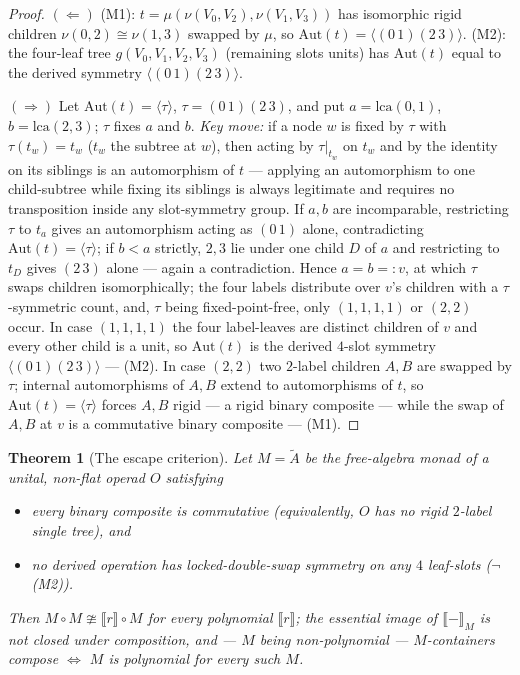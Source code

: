 \documentclass[11pt]{amsart}
\theoremstyle{plain}
\newtheorem{theorem}{Theorem}[section]
\theoremstyle{definition}
\newcommand{\ext}[1]{\llbracket #1 \rrbracket}
\newcommand{\extM}[1]{\llbracket #1 \rrbracket_{M}}
\begin{document}
\begin{proof}
$(\Leftarrow)$ (M1): $t=\mu(\nu(V_0,V_2),\nu(V_1,V_3))$ has isomorphic rigid children
$\nu(0,2)\cong\nu(1,3)$ swapped by $\mu$, so $\mathrm{Aut}(t)=\langle(0\,1)(2\,3)\rangle$. (M2): the
four-leaf tree $g(V_0,V_1,V_2,V_3)$ (remaining slots units) has $\mathrm{Aut}(t)$ equal to the derived
symmetry $\langle(0\,1)(2\,3)\rangle$.

$(\Rightarrow)$ Let $\mathrm{Aut}(t)=\langle\tau\rangle$, $\tau=(0\,1)(2\,3)$, and put
$a=\mathrm{lca}(0,1)$, $b=\mathrm{lca}(2,3)$; $\tau$ fixes $a$ and $b$. \emph{Key move:} if a node $w$ is
fixed by $\tau$ with $\tau(t_w)=t_w$ \textup{(}$t_w$ the subtree at $w$\textup{)}, then acting by
$\tau|_{t_w}$ on $t_w$ and by the identity on its siblings is an automorphism of $t$ --- applying an
automorphism to one child-subtree while fixing its siblings is always legitimate and requires no
transposition inside any slot-symmetry group. If $a,b$ are incomparable, restricting $\tau$ to $t_a$ gives
an automorphism acting as $(0\,1)$ alone, contradicting $\mathrm{Aut}(t)=\langle\tau\rangle$; if $b<a$
strictly, $2,3$ lie under one child $D$ of $a$ and restricting to $t_D$ gives $(2\,3)$ alone --- again a
contradiction. Hence $a=b=:v$, at which $\tau$ swaps children isomorphically; the four labels distribute
over $v$'s children with a $\tau$-symmetric count, and, $\tau$ being fixed-point-free, only $(1,1,1,1)$ or
$(2,2)$ occur. In case $(1,1,1,1)$ the four label-leaves are distinct children of $v$ and every other
child is a unit, so $\mathrm{Aut}(t)$ is the derived $4$-slot symmetry $\langle(0\,1)(2\,3)\rangle$ ---
(M2). In case $(2,2)$ two $2$-label children $A,B$ are swapped by $\tau$; internal automorphisms of $A,B$
extend to automorphisms of $t$, so $\mathrm{Aut}(t)=\langle\tau\rangle$ forces $A,B$ rigid --- a rigid
binary composite --- while the swap of $A,B$ at $v$ is a commutative binary composite --- (M1).
\end{proof}

\begin{theorem}[The escape criterion]\label{thm:main}
Let $M=\tilde A$ be the free-algebra monad of a unital, non-flat operad $O$ satisfying
\begin{itemize}
\item[\textup{(i)}] every binary composite is commutative \textup{(}equivalently, $O$ has no rigid
  $2$-label single tree\textup{)}, and
\item[\textup{(ii)}] no derived operation has locked-double-swap symmetry on any $4$ leaf-slots
  \textup{(}$\neg$\textup{(M2)}\textup{)}.
\end{itemize}
Then $M\circ M\ncong\ext r\circ M$ for every polynomial $\ext r$; the essential image of $\extM{-}$ is not
closed under composition, and --- $M$ being non-polynomial --- $M$-containers compose $\iff$ $M$ is
polynomial for every such $M$.
\end{theorem}
\end{document}
